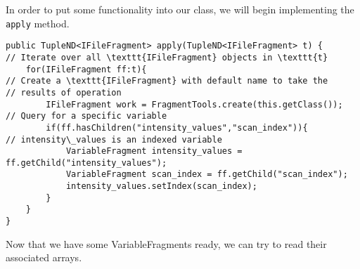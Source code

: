 \documentclass[a4paper,10pt]{article}
\begin{document}

% 
% 
% 
% 	
% 	
% 
In order to put some functionality into our class, we will begin implementing the \texttt{apply} method.
\lstset{language=Java,basicstyle=\small,breaklines=true,texcl=true,tabsize=4}
\begin{lstlisting}
public TupleND<IFileFragment> apply(TupleND<IFileFragment> t) {
// Iterate over all \texttt{IFileFragment} objects in \texttt{t}
	for(IFileFragment ff:t){
// Create a \texttt{IFileFragment} with default name to take the
// results of operation
		IFileFragment work = FragmentTools.create(this.getClass());
// Query for a specific variable
		if(ff.hasChildren("intensity_values","scan_index")){
// intensity\_values is an indexed variable
			VariableFragment intensity_values = ff.getChild("intensity_values");
			VariableFragment scan_index = ff.getChild("scan_index");
			intensity_values.setIndex(scan_index);
		}
	}
}
\end{lstlisting}
Now that we have some VariableFragments ready, we can try to read their associated arrays.
\end{document}
